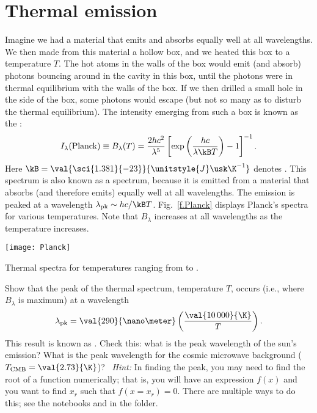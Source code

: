 \section{Thermal emission}
\label{s.thermal-emission}

Imagine we had a material that emits and absorbs equally well at all wavelengths. We then made from this material a hollow box, and we heated this box to a temperature $T$. The hot atoms in the walls of the box would emit (and absorb) photons bouncing around in the cavity in this box, until the photons were in thermal equilibrium with the walls of the box. If we then drilled a small hole in the side of the box, some photons would escape (but not so many as to disturb the thermal equilibrium). The intensity emerging from such a box is known as the :
\begin{equation}\label{e.planck-spectrum-wavelength}
I_{\lambda}(\mathrm{Planck}) \equiv B_{\lambda}(T) = \frac{2hc^{2}}{\lambda^{5}} \left[\exp\left(\frac{hc}{\lambda\kB T}\right)-1\right]^{-1}.
\end{equation}
Here $\kB = \val{\sci{1.381}{-23}}{\unitstyle{J}\usk\K^{-1}}$ denotes . This spectrum is also known as a  spectrum, because it is emitted from a material that absorbs (and therefore emits) equally well at all wavelengths. The emission is peaked at a wavelength $\lambda_{\mathrm{pk}} \sim hc/\kB T$. 
Fig.~\ref{f.Planck} displays Planck's spectra for various temperatures. Note that $B_{\lambda}$ increases at all wavelengths as the temperature increases.
\begin{marginfigure}[-12\baselineskip]
\texttt{[image: Planck]}
\caption[Thermal spectra]{\label{f.Planck}Thermal spectra for temperatures ranging from  to .}
\end{marginfigure}

\begin{exercisebox}\label{ex.Wien-wavelength}
Show that the peak of the thermal spectrum, temperature $T$, occurs (i.e., where $B_{\lambda}$ is maximum) at a wavelength
\[ \lambda_{\mathrm{pk}} = \val{290}{\nano\meter}\left(\frac{\val{10\,000}{\K}}{T}\right). \]
This result is known as . Check this: what is the peak wavelength of the sun's emission? What is the peak wavelength for the cosmic microwave background ($T_{\mathrm{CMB}} = \val{2.73}{\K}$)? \notebook~\emph{Hint:} In finding the peak, you may need to find the root of a function numerically; that is, you will have an expression $f(x)$ and you want to find $x_{r}$ such that $f(x=x_{r}) = 0$. There are multiple ways to do this; see the notebooks  and  in the  folder.
\end{exercisebox}

